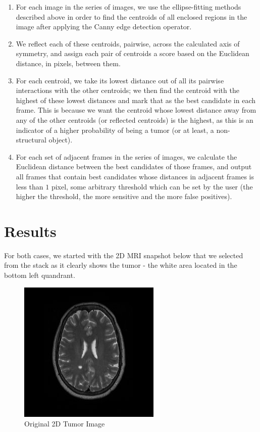 \documentclass[12pt]{article}
\theoremstyle{plain}%
\theoremstyle{definition}
\theoremstyle{remark}
\begin{document}
\begin{enumerate}
\item For each image in the series of images, we use the ellipse-fitting methods described above in order to find the centroids of all enclosed regions in the image after applying the Canny edge detection operator.
\item We reflect each of these centroids, pairwise, across the calculated axis of symmetry, and assign each pair of centroids a score based on the Euclidean distance, in pixels, between them.
\item For each centroid, we take its lowest distance out of all its pairwise interactions with the other centroids; we then find the centroid with the highest of these lowest distances and mark that as the best candidate in each frame. This is because we want the centroid whose lowest distance away from any of the other centroids (or reflected centroids) is the highest, as this is an indicator of a higher probability of being a tumor (or at least, a non-structural object).
\item For each set of adjacent frames in the series of images, we calculate the Euclidean distance between the best candidates of those frames, and output all frames that contain best candidates whose distances in adjacent frames is less than $1$ pixel, some arbitrary threshold which can be set by the user (the higher the threshold, the more sensitive and the more false positives).
\end{enumerate}

\section{Results}

For both cases, we started with the 2D MRI snapshot below that we selected from the stack as it clearly shows the tumor - the white area located in the bottom left quandrant.

\begin{figure}[!h]
	\centering
		\includegraphics[width=.3\textwidth]{original.jpg}
	\caption{Original 2D Tumor Image}
\end{figure}
\end{document}
